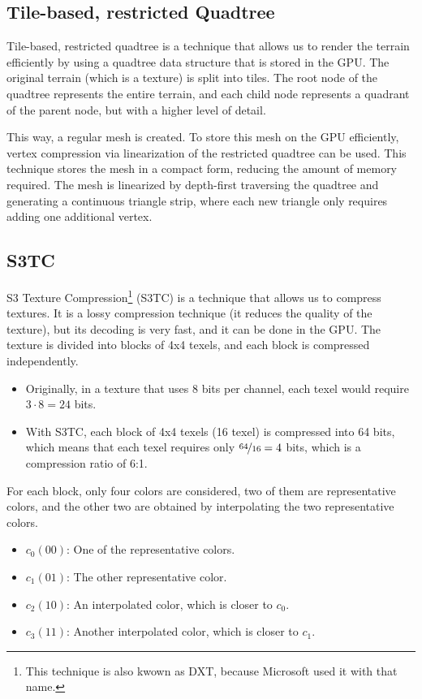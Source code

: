 \subsection{Tile-based, restricted Quadtree}

Tile-based, restricted quadtree is a technique that allows us to render the terrain efficiently by using a quadtree data structure that is stored in the GPU. The original terrain (which is a texture) is split into tiles. The root node of the quadtree represents the entire terrain, and each child node represents a quadrant of the parent node, but with a higher level of detail.

This way, a regular mesh is created. To store this mesh on the GPU efficiently, vertex compression via linearization of the restricted quadtree can be used. This technique stores the mesh in a compact form, reducing the amount of memory required. The mesh is linearized by depth-first traversing the quadtree and generating a continuous triangle strip, where each new triangle only requires adding one additional vertex.

\subsection{S3TC}

S3 Texture Compression\footnote{This technique is also kwown as DXT, because Microsoft used it with that name.} (S3TC) is a technique that allows us to compress textures. It is a lossy compression technique (it reduces the quality of the texture), but its decoding is very fast, and it can be done in the GPU. The texture is divided into blocks of 4x4 texels, and each block is compressed independently.
\begin{itemize}
    \item Originally, in a texture that uses $8$ bits per channel, each texel would require $3\cdot 8 = 24$ bits.
    \item With S3TC, each block of 4x4 texels (16 texel) is compressed into 64 bits, which means that each texel requires only $\nicefrac{64}{16} = 4$ bits, which is a compression ratio of 6:1.
\end{itemize}

For each block, only four colors are considered, two of them are representative colors, and the other two are obtained by interpolating the two representative colors.
\begin{itemize}
    \item $c_0 (00)$: One of the representative colors.
    \item $c_1 (01)$: The other representative color.
    \item $c_2 (10)$: An interpolated color, which is closer to $c_0$.
    \item $c_3 (11)$: Another interpolated color, which is closer to $c_1$.
\end{itemize}

